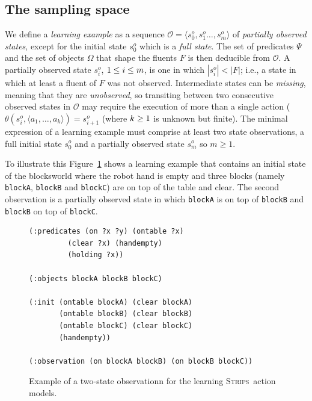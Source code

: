 \documentclass{article}
\newcommand{\tup}[1]{{\langle #1 \rangle}}
\newcommand{\strips}{\textsc{Strips}}
\begin{document}
\subsection{The sampling space}
We define a {\em learning example} as a sequence $\mathcal{O}=\tup{s_0^o,s_1^o \ldots, s_m^o}$ of {\em partially observed states}, except for the initial state $s_0^o$ which is a {\em full state}. The set of predicates $\Psi$ and the set of objects $\Omega$ that shape the fluents $F$ is then deducible from $\mathcal{O}$. A partially observed state $s_i^o$, ${\small 1\leq i\leq m}$, is one in which $|s_i^o| < |F|$; i.e., a state in which at least a fluent of $F$ was not observed. Intermediate states can be {\em missing}, meaning that they are {\em unobserved}, so transiting between two consecutive observed states in $\mathcal{O}$ may require the execution of more than a single action ($\theta(s_i^o,\tup{a_1,\ldots,a_k})=s_{i+1}^o$ (where ${\small k\geq 1}$ is unknown but finite). The minimal expression of a learning example must comprise at least two state observations, a full initial state $s_0^o$ and a partially observed state $s_m^o$ so $m \geq 1$.

To illustrate this Figure~\ref{fig:observation} shows a learning example that contains an initial state of the blocksworld where the robot hand is empty and three blocks (namely {\small\tt blockA}, {\small\tt blockB} and {\small\tt blockC}) are on top of the table and clear. The second observation is a partially observed state in which {\tt blockA} is on top of {\tt blockB} and {\tt blockB} on top of {\tt blockC}.
\begin{figure}[hbt!]
  \begin{tiny}
  \begin{verbatim}
(:predicates (on ?x ?y) (ontable ?x)
	     (clear ?x) (handempty)
	     (holding ?x))

(:objects blockA blockB blockC)

(:init (ontable blockA) (clear blockA)
       (ontable blockB) (clear blockB)
       (ontable blockC) (clear blockC)
       (handempty))

(:observation (on blockA blockB) (on blockB blockC))
  \end{verbatim}
  \end{tiny}
	\caption{\small Example of a two-state observationn for the learning \strips\ action models.}
	\label{fig:observation}
\end{figure}
\end{document}
